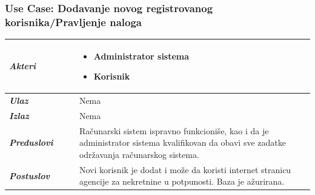 \documentclass[20pt]{article}
\begin{document}
\subsubsection{\bfseries \large Use Case: Dodavanje novog registrovanog korisnika/Pravljenje naloga}
\begin{center}
\begin{longtable}{p{0.23\linewidth} p{0.77\linewidth}}
 \hline
 {\it \bfseries Akteri} & \begin{itemize}
    \item Administrator sistema
    \item Korisnik
\end{itemize}\\
\hline

 {\it \bfseries Ulaz} & Nema\\
 \hline
 
 {\it \bfseries Izlaz} & Nema\\
 \hline
 
 {\it \bfseries Preduslovi} & Ra\v {c}unarski sistem ispravno funkcioni\v {s}e, kao i da je administrator sistema kvalifikovan da obavi sve zadatke odr\v {z}avanja ra\v {c}unarskog sistema.\\
 \hline
 
 {\it \bfseries Postuslov} & Novi korisnik je dodat i mo\v {z}e da koristi internet stranicu agencije za nekretnine u potpunosti. Baza je a\v {z}urirana.\\
 \hline


\end{longtable}
\end{center}
\end{document}
